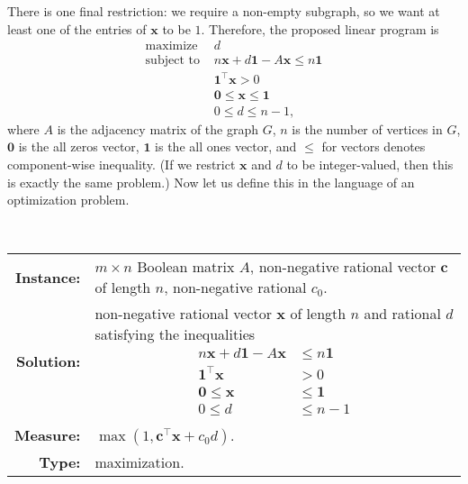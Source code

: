 \documentclass[]{article}
\begin{document}
There is one final restriction: we require a non-empty subgraph, so we want at least one of the entries of $\mathbf{x}$ to be $1$.
Therefore, the proposed linear program is
\begin{align*}
  \text{maximize } & d \\
  \text{subject to }
  & n \mathbf{x} + d \mathbf{1} - A \mathbf{x} \leq n \mathbf{1} \\
  & \mathbf{1}^\intercal \mathbf{x} > 0 \\
  & \mathbf{0} \leq \mathbf{x} \leq \mathbf{1} \\
  & 0 \leq d \leq n - 1,
\end{align*}
where $A$ is the adjacency matrix of the graph $G$, $n$ is the number of vertices in $G$, $\mathbf{0}$ is the all zeros vector, $\mathbf{1}$ is the all ones vector, and $\leq$ for vectors denotes component-wise inequality.
(If we restrict $\mathbf{x}$ and $d$ to be integer-valued, then this is exactly the same problem.)
Now let us define this in the language of an optimization problem.
\begin{definition}
  \mbox{} \\
  \begin{tabular}{r p{9.5cm}}
    \textbf{Instance:} & $m \times n$ Boolean matrix $A$, non-negative rational vector $\mathbf{c}$ of length $n$, non-negative rational $c_0$. \\
    \textbf{Solution:} & non-negative rational vector $\mathbf{x}$ of length $n$ and rational $d$ satisfying the inequalities
           {
             \begin{align*}
               n \mathbf{x} + d \mathbf{1} - A \mathbf{x} & \leq n \mathbf{1} \\
               \mathbf{1}^\intercal \mathbf{x} & > 0 \\
               \mathbf{0} \leq \mathbf{x} & \leq \mathbf{1} \\
               0 \leq d & \leq n - 1
             \end{align*}
           } \\[-1em]
    \textbf{Measure:} & $\max(1, \mathbf{c}^\intercal \mathbf{x} + c_0 d)$. \\
    \textbf{Type:} & maximization.
  \end{tabular}
\end{definition}
\end{document}
